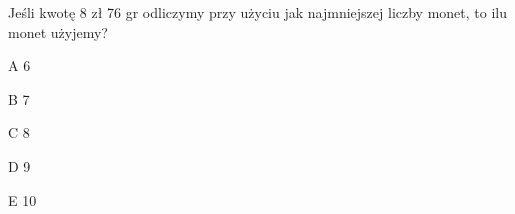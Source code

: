 \begin{tresc}
Jeśli kwotę 8 zł 76 gr odliczymy przy użyciu jak najmniejszej liczby monet, to ilu monet użyjemy?
\end{tresc}
\begin{wariant}{A} 6 \end{wariant}
\begin{wariant}{B} 7 \end{wariant}
\begin{wariant}{C} 8 \end{wariant}
\begin{wariant}{D} 9 \end{wariant}
\begin{wariant}{E} 10 \end{wariant}
